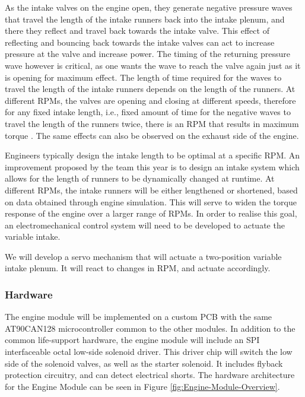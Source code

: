As the intake valves on the engine open, they generate negative pressure waves that travel the length of the intake runners back into the intake plenum, and there they reflect and travel back towards the intake valve. This effect of reflecting and bouncing back towards the intake valves can act to increase pressure at the valve and increase power. The timing of the returning pressure wave however is critical, as one wants the wave to reach the valve again just as it is opening for maximum effect. The length of time required for the waves to travel the length of the intake runners depends on the length of the runners. At different RPMs, the valves are opening and closing at different speeds, therefore for any fixed intake length, i.e., fixed amount of time for the negative waves to travel the length of the runners twice, there is an RPM that results in maximum torque \cite{Modelingof20}. The same effects can also be observed on the exhaust side of the engine.

Engineers typically design the intake length to be optimal at a specific RPM. An improvement proposed by the team this year is to design an intake system which allows for the length of runners to be dynamically changed at runtime. At different RPMs, the intake runners will be either lengthened or shortened, based on data obtained through engine simulation. This will serve to widen the torque response of the engine over a larger range of RPMs. In order to realise this goal, an electromechanical control system will need to be developed to actuate the variable intake.

We will develop a servo mechanism that will actuate a two-position variable intake plenum. It will react to changes in RPM, and actuate accordingly.

\subsubsection{Hardware}

The engine module will be implemented on a custom PCB with the same AT90CAN128 microcontroller common to the other modules. In addition to the common life-support hardware, the engine module will include an SPI interfaceable octal low-side solenoid driver. This driver chip will switch the low side of the solenoid valves, as well as the starter solenoid. It includes flyback protection circuitry, and can detect electrical shorts. The hardware architecture for the Engine Module can be seen in Figure \ref{fig:Engine-Module-Overview}.

